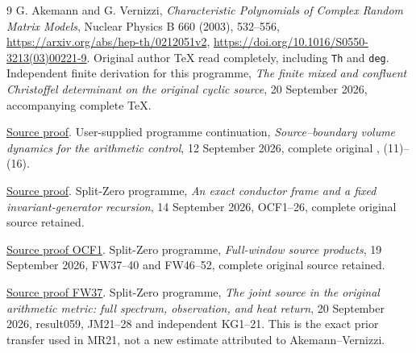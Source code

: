 \documentclass[11pt]{article}
\begin{document}
\begin{thebibliography}{9}
 G. Akemann and G. Vernizzi,
\emph{Characteristic Polynomials of Complex Random Matrix Models},
Nuclear Physics B 660 (2003), 532--556,
\url{https://arxiv.org/abs/hep-th/0212051v2},
\url{https://doi.org/10.1016/S0550-3213(03)00221-9}.
Original author TeX read completely, including \texttt{Th} and \texttt{deg}.
 Independent finite derivation for this programme,
\emph{The finite mixed and confluent Christoffel determinant on the
original cyclic source}, 20 September 2026, accompanying complete TeX.

\href{https://github.com/KokunoYumeto/zeta-function-research-reader/blob/5992ad50c0f2a06921f1fcaded7b4e38097c0739/workbenches/splitzero-tandem/continuations/20260920-original-kernel-mixed-determinants/MIXED_CONFLUENT_PROOF.tex\#L1}{Source proof}.
 User-supplied programme continuation,
\emph{Source--boundary volume dynamics for the arithmetic control},
12 September 2026, complete original , (11)--(16).

\href{https://github.com/KokunoYumeto/zeta-function-research-reader/blob/5992ad50c0f2a06921f1fcaded7b4e38097c0739/workbenches/splitzero-tandem/continuations/20260920-original-kernel-mixed-determinants/providers/TODA_VOLUME_CONTROL.tex\#L1}{Source proof}.
 Split-Zero programme,
\emph{An exact conductor frame and a fixed invariant-generator recursion},
14 September 2026, OCF1--26, complete original source retained.

\href{https://github.com/KokunoYumeto/zeta-function-research-reader/blob/5992ad50c0f2a06921f1fcaded7b4e38097c0739/workbenches/splitzero-tandem/continuations/20260920-original-kernel-mixed-determinants/providers/ORIGINAL_CONDUCTOR_STRIP_FRAME.tex\#L27}{Source proof OCF1}.
 Split-Zero programme,
\emph{Full-window source products}, 19 September 2026,
FW37--40 and FW46--52, complete original source retained.

\href{https://github.com/KokunoYumeto/zeta-function-research-reader/blob/5992ad50c0f2a06921f1fcaded7b4e38097c0739/workbenches/splitzero-tandem/continuations/20260920-original-kernel-mixed-determinants/providers/FULL_WINDOW_SOURCE_PRODUCTS.tex\#L577}{Source proof FW37}.
 Split-Zero programme,
\emph{The joint source in the original arithmetic metric: full spectrum,
observation, and heat return}, 20 September 2026, result059,
JM21--28 and independent KG1--21. This is the exact prior transfer
used in MR21, not a new estimate attributed to Akemann--Vernizzi.


\end{thebibliography}
\end{document}
